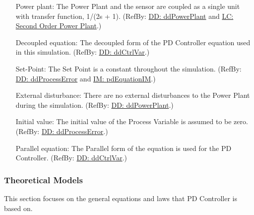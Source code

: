 \documentclass[12pt]{article}
\begin{document}
\begin{itemize}
\item[Power plant:\phantomsection\label{pwrPlant}]{The Power Plant and the sensor are coupled as a single unit with transfer function, 1/(2s + 1). (RefBy: \hyperref[DD:ddPowerPlant]{DD: ddPowerPlant} and \hyperref[likeChgIC]{LC: Second Order Power Plant}.)}
\item[Decoupled equation:\phantomsection\label{decoupled}]{The decoupled form of the PD Controller equation used in this simulation. (RefBy: \hyperref[DD:ddCtrlVar]{DD: ddCtrlVar}.)}
\item[Set-Point:\phantomsection\label{setPoint}]{The Set Point is a constant throughout the simulation. (RefBy: \hyperref[DD:ddProcessError]{DD: ddProcessError} and \hyperref[IM:pdEquationIM]{IM: pdEquationIM}.)}
\item[External disturbance:\phantomsection\label{externalDistub}]{There are no external disturbances to the Power Plant during the simulation. (RefBy: \hyperref[DD:ddPowerPlant]{DD: ddPowerPlant}.)}
\item[Initial value:\phantomsection\label{initialValue}]{The initial value of the Process Variable is assumed to be zero. (RefBy: \hyperref[DD:ddProcessError]{DD: ddProcessError}.)}
\item[Parallel equation:\phantomsection\label{parallelEq}]{The Parallel form of the equation is used for the PD Controller. (RefBy: \hyperref[DD:ddCtrlVar]{DD: ddCtrlVar}.)}
\end{itemize}
\subsubsection{Theoretical Models}
\label{Sec:TMs}
This section focuses on the general equations and laws that PD Controller is based on.
\end{document}
